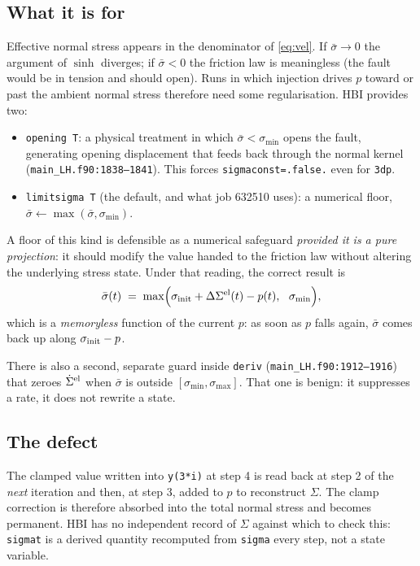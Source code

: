 \documentclass[11pt]{article}
\newcommand{\code}[1]{\texttt{#1}}
\newcommand{\sigeff}{\bar{\sigma}}
\newcommand{\sigtot}{\Sigma}
\begin{document}
\subsection{What it is for}

Effective normal stress appears in the denominator of \eqref{eq:vel}. If
$\sigeff\to0$ the argument of $\sinh$ diverges; if $\sigeff<0$ the friction
law is meaningless (the fault would be in tension and should open). Runs in
which injection drives $p$ toward or past the ambient normal stress therefore
need some regularisation. HBI provides two:

\begin{itemize}
\item \code{opening T}: a physical treatment in which
      $\sigeff<\sigma_{\min}$ opens the fault, generating opening
      displacement that feeds back through the normal kernel
      (\code{main\_LH.f90:1838--1841}). This forces
      \code{sigmaconst=.false.} even for \code{3dp}.
\item \code{limitsigma T} (the default, and what job 632510 uses): a
      numerical floor, $\sigeff \leftarrow \max(\sigeff, \sigma_{\min})$.
\end{itemize}

A floor of this kind is defensible as a numerical safeguard \emph{provided it
is a pure projection}: it should modify the value handed to the friction law
without altering the underlying stress state. Under that reading, the correct
result is
\begin{equation}
  \sigeff(t) \;=\; \max\!\Big(\sigma_{\rm init} + \Delta\sigtot^{\rm el}(t) - p(t),\ \ \sigma_{\min}\Big),
  \label{eq:intended}
\end{equation}
which is a \emph{memoryless} function of the current $p$: as soon as $p$ falls
again, $\sigeff$ comes back up along $\sigma_{\rm init}-p$.

There is also a second, separate guard inside \code{deriv}
(\code{main\_LH.f90:1912--1916}) that zeroes $\dot\sigtot^{\rm el}$ when
$\sigeff$ is outside $[\sigma_{\min},\sigma_{\max}]$. That one is benign: it
suppresses a rate, it does not rewrite a state.

\subsection{The defect}

The clamped value written into \code{y(3*i)} at step 4 is read back at step 2
of the \emph{next} iteration and then, at step 3, added to $p$ to reconstruct
$\sigtot$. The clamp correction is therefore absorbed into the total normal
stress and becomes permanent. HBI has no independent record of $\sigtot$
against which to check this: \code{sigmat} is a derived quantity recomputed
from \code{sigma} every step, not a state variable.
\end{document}
